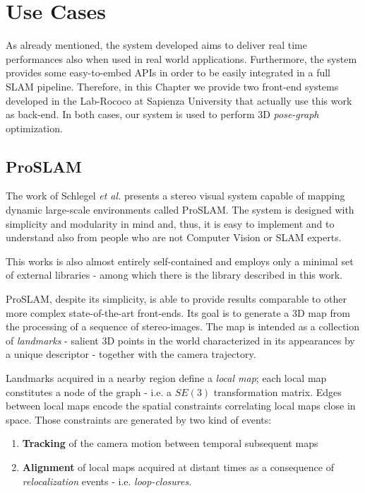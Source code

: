 \chapter{Use Cases}\label{ch:cases}
As already mentioned, the system developed aims to deliver real time performances also when used in real world applications. Furthermore, the system provides some easy-to-embed APIs in order to be easily integrated in a full SLAM pipeline. Therefore, in this Chapter we provide two front-end systems developed in the Lab-Rococo at Sapienza University that actually use this work as back-end. In both cases, our system is used to perform 3D \textit{pose-graph} optimization.

\section{ProSLAM}\label{sec:proslam}
The work of Schlegel \textit{et al.} \cite{schlegel2017proslam} presents a stereo visual system capable of mapping dynamic large-scale environments called ProSLAM. The system is designed with simplicity and modularity in mind and, thus, it is easy to implement and to understand also from people who are not Computer Vision or SLAM experts.

This works is also almost entirely self-contained and employs only a minimal set of external libraries - among which there is the library described in this work.

ProSLAM, despite its simplicity, is able to provide results comparable to other more complex state-of-the-art front-ends. Its goal is to generate a 3D map from the processing of a sequence of stereo-images. The map is intended as a collection of \textit{landmarks} - salient 3D points in the world characterized in its appearances by a unique descriptor - together with the camera trajectory. 

Landmarks acquired in a nearby region define a \textit{local map}; each local map constitutes a node of the graph - i.e. a $SE(3)$ transformation matrix. Edges between local maps encode the spatial constraints correlating local maps close in space. Those constraints are generated by two kind of events:

\begin{enumerate}
    \item \textbf{Tracking} of the camera motion between temporal subsequent maps
    \item \textbf{Alignment} of local maps acquired at distant times as a consequence of \textit{relocalization} events - i.e. \textit{loop-closures}.
\end{enumerate}

